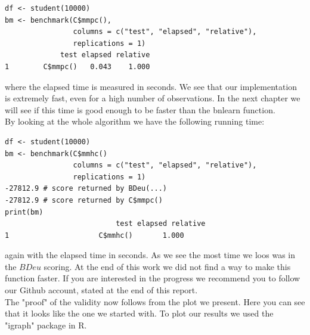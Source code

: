 		\begin{verbatim}
df <- student(10000)
bm <- benchmark(C$mmpc(),
                columns = c("test", "elapsed", "relative"),
                replications = 1)
             test elapsed relative
1        C$mmpc()   0.043    1.000
		\end{verbatim}
		
		where the elapsed time is measured in seconds. We see that our implementation is extremely fast, even for a high number of observations. In the next chapter we will see if this time is good enough to be faster than the bnlearn function.\\
		By looking at the whole algorithm we have the following running time:

		\begin{verbatim}
df <- student(10000)
bm <- benchmark(C$mmhc()
                columns = c("test", "elapsed", "relative"),
                replications = 1)
-27812.9 # score returned by BDeu(...)
-27812.9 # score returned by C$mmpc()
print(bm)
                          test elapsed relative
1                     C$mmhc()       1.000
		\end{verbatim}

		again with the elapsed time in seconds. As we see the most time we loos was in the $BDeu$ scoring. At the end of this work we did not find a way to make this function faster. If you are interested in the progress we recommend you to follow our Github account, stated at the end of this report.\\
		The "proof" of the validity now follows from the plot we present. Here you can see that it looks like the one we started with. To plot our results we used the "igraph" package in R.

		 \label{img.resultingGraph}


